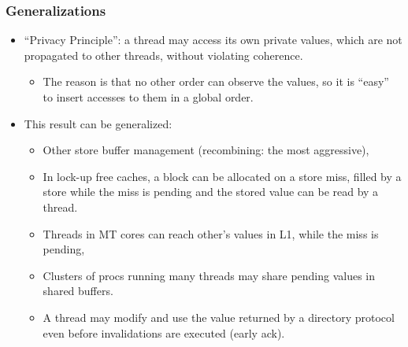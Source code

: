 \documentclass{beamer}
\newcommand{\emp}[1]{\textcolor{DikuRed}{ #1}}
\begin{document}
\begin{frame}[fragile,t]
\frametitle{Generalizations}

\begin{itemize}
    \item \emp{``Privacy Principle''}: a thread may access its own
            private values, which are not propagated to other threads,
            without violating coherence.
        \begin{itemize}
            \item The reason is that no other order can observe the
                    values, so it is ``easy'' to insert accesses to them in a global order.
        \end  {itemize}\bigskip

    \item This result can be generalized:
        \begin{itemize}
            \item Other store buffer management (recombining: the most aggressive),
            \item In lock-up free caches, a block can be allocated on a store miss,
                    filled by a store while the miss is pending and the stored value
                    can be read by a thread.
            \item Threads in MT cores can reach other's values in L1, while the miss is pending,
            \item Clusters of procs running many threads may share pending values in shared buffers.
            \item A thread may modify and use the value returned by a directory
                    protocol even before invalidations are executed (early ack).
        \end  {itemize}\bigskip

\end{itemize}


\end{frame}
\end{document}
